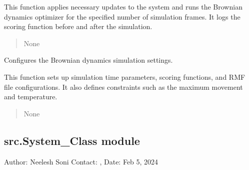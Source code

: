 \documentclass[letterpaper,10pt,english]{sphinxmanual}
\begin{document}
\begin{fulllineitems}
\begin{fulllineitems}
\sphinxAtStartPar
This function applies necessary updates to the system and runs the
Brownian dynamics optimizer for the specified number of simulation frames.
It logs the scoring function before and after the simulation.
\begin{quote}\begin{description}
\sphinxAtStartPar
{}

\sphinxAtStartPar
None

\end{description}\end{quote}

\end{fulllineitems}


\begin{fulllineitems}
\label{\detokenize{src:src.Simulation_Class.Simulation.setup_brownian_dynamics}}
\pysigstartsignatures
{}
\pysigstopsignatures
\sphinxAtStartPar
Configures the Brownian dynamics simulation settings.

\sphinxAtStartPar
This function sets up simulation time parameters, scoring functions,
and RMF file configurations. It also defines constraints such as
the maximum movement and temperature.
\begin{quote}\begin{description}
\sphinxAtStartPar
{}

\sphinxAtStartPar
None

\end{description}\end{quote}

\end{fulllineitems}


\end{fulllineitems}



\subsection{src.System\_Class module}
\label{\detokenize{src:module-src.System_Class}}\label{\detokenize{src:src-system-class-module}}
\sphinxAtStartPar
Author: Neelesh Soni
Contact: , 
Date: Feb 5, 2024
\end{document}
